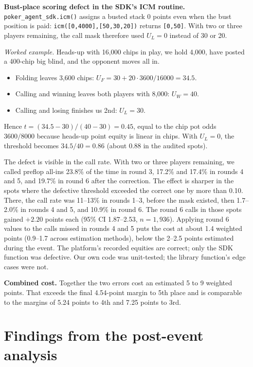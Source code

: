 \documentclass[10pt]{article}
\begin{document}
\textbf{Bust-place scoring defect in the SDK's ICM routine.} \texttt{poker\_agent\_sdk.icm()} assigns a busted stack 0 points even when the bust position is paid: \texttt{icm([0,4000],[50,30,20])} returns \texttt{[0,50]}. With two or three players remaining, the call mask therefore used $U_L=0$ instead of 30 or 20.

\emph{Worked example.} Heads-up with 16,000 chips in play, we hold 4,000, have posted a 400-chip big blind, and the opponent moves all in.
\begin{itemize}
\item Folding leaves 3,600 chips: $U_F=30+20\cdot3600/16000=34.5$.
\item Calling and winning leaves both players with 8,000: $U_W=40$.
\item Calling and losing finishes us 2nd: $U_L=30$.
\end{itemize}
Hence $t=(34.5-30)/(40-30)=0.45$, equal to the chip pot odds $3600/8000$ because heads-up point equity is linear in chips. With $U_L=0$, the threshold becomes $34.5/40=0.86$ (about 0.88 in the audited spots).

The defect is visible in the call rate. With two or three players remaining, we called preflop all-ins 23.8\% of the time in round 3, 17.2\% and 17.4\% in rounds 4 and 5, and 19.7\% in round 6 after the correction. The effect is sharper in the spots where the defective threshold exceeded the correct one by more than 0.10. There, the call rate was 11--13\% in rounds 1--3, before the mask existed, then 1.7--2.0\% in rounds 4 and 5, and 10.9\% in round 6. The round 6 calls in those spots gained $+2.20$ points each (95\% CI 1.87--2.53, $n=1{,}936$). Applying round 6 values to the calls missed in rounds 4 and 5 puts the cost at about 1.4 weighted points (0.9--1.7 across estimation methods), below the 2--2.5 points estimated during the event. The platform's recorded equities are correct; only the SDK function was defective. Our own code was unit-tested; the library function's edge cases were not.

\textbf{Combined cost.} Together the two errors cost an estimated 5 to 9 weighted points. That exceeds the final 4.54-point margin to 5th place and is comparable to the margins of 5.24 points to 4th and 7.25 points to 3rd.

\section{Findings from the post-event analysis}\label{sec:postevent}
\end{document}
